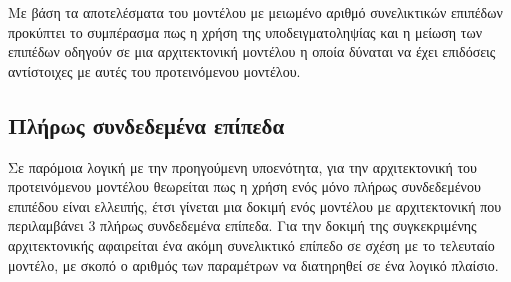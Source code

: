 Με βάση τα αποτελέσματα του μοντέλου με μειωμένο αριθμό συνελικτικών επιπέδων προκύπτει το συμπέρασμα πως η χρήση της υποδειγματοληψίας και η μείωση των επιπέδων οδηγούν σε μια αρχιτεκτονική μοντέλου η οποία δύναται να έχει επιδόσεις αντίστοιχες με αυτές του προτεινόμενου μοντέλου.\\

\subsection{Πλήρως συνδεδεμένα επίπεδα}
Σε παρόμοια λογική με την προηγούμενη υποενότητα, για την αρχιτεκτονική του προτεινόμενου μοντέλου θεωρείται πως η χρήση ενός μόνο πλήρως συνδεδεμένου επιπέδου είναι ελλειπής, έτσι γίνεται μια δοκιμή ενός μοντέλου με αρχιτεκτονική που περιλαμβάνει 3 πλήρως συνδεδεμένα επίπεδα. Για την δοκιμή της συγκεκριμένης αρχιτεκτονικής αφαιρείται ένα ακόμη συνελικτικό επίπεδο σε σχέση με το τελευταίο μοντέλο, με σκοπό ο αριθμός των παραμέτρων να διατηρηθεί σε ένα λογικό πλαίσιο.

